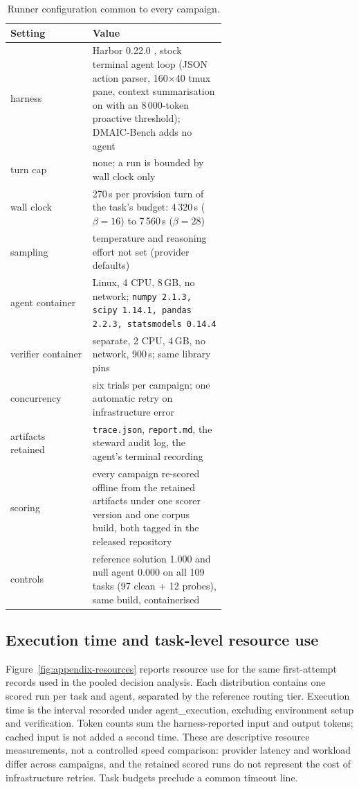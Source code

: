 \documentclass{article}
\begin{document}
\begin{table}[!htbp]
\caption{Runner configuration common to every campaign.}
\label{tab:runner}
\centering
\footnotesize
\begin{tabular}{@{}lP{0.62\linewidth}@{}}
\toprule
Setting & Value \\
\midrule
harness & Harbor 0.22.0 \citep{merrill2026terminalbench}, stock terminal agent loop (JSON action parser, 160$\times$40 tmux pane, context summarisation on with an 8\,000-token proactive threshold); DMAIC-Bench adds no agent \\
turn cap & none; a run is bounded by wall clock only \\
wall clock & 270\,s per provision turn of the task's budget: 4\,320\,s ($\beta=16$) to 7\,560\,s ($\beta=28$) \\
sampling & temperature and reasoning effort not set (provider defaults) \\
agent container & Linux, 4 CPU, 8\,GB, no network; \texttt{numpy 2.1.3, scipy 1.14.1, pandas 2.2.3, statsmodels 0.14.4} \\
verifier container & separate, 2 CPU, 4\,GB, no network, 900\,s; same library pins \\
concurrency & six trials per campaign; one automatic retry on infrastructure error \\
artifacts retained & \texttt{trace.json}, \texttt{report.md}, the steward audit log, the agent's terminal recording \\
scoring & every campaign re-scored offline from the retained artifacts under one scorer version and one corpus build, both tagged in the released repository \\
controls & reference solution 1.000 and null agent 0.000 on all 109 tasks (97 clean + 12 probes), same build, containerised \\
\bottomrule
\end{tabular}

\end{table}


\subsection*{Execution time and task-level resource use}
\label{app:resources}

Figure~\ref{fig:appendix-resources} reports resource use for the same first-attempt records used in the pooled decision analysis. Each distribution contains one scored run per task and agent, separated by the reference routing tier. Execution time is the interval recorded under {agent\_execution}, excluding environment setup and verification. Token counts sum the harness-reported input and output tokens; cached input is not added a second time. These are descriptive resource measurements, not a controlled speed comparison: provider latency and workload differ across campaigns, and the retained scored runs do not represent the cost of infrastructure retries. Task budgets preclude a common timeout line.
\end{document}
